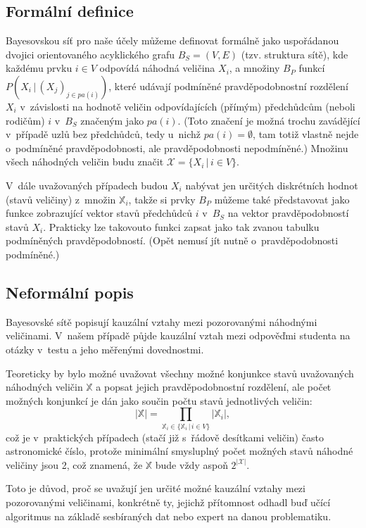 \documentclass[a4paper,twoside,12pt]{scrbook}
\begin{document}
\subsection{Formální definice}
Bayesovskou síť pro naše účely můžeme definovat formálně jako uspořádanou dvojici orientovaného acyklického grafu $B_S = (V,E)$ (tzv. struktura sítě), kde každému prvku $i \in V$ odpovídá náhodná veličina $X_i$, a množiny $B_P$  funkcí $P(X_i\,|\,(X_j)_{j\in pa(i)})$, které udávají podmíněné pravděpodobnostní rozdělení $X_i$ v~závislosti na hodnotě veličin odpovídajících (přímým) předchůdcům (neboli rodičům) $i$ v~$B_S$ značeným jako $pa(i)$. (Toto značení je možná trochu zavádějící v~případě uzlů bez předchůdců, tedy u~nichž $pa(i) = \emptyset$, tam totiž vlastně nejde o~podmíněné pravděpodobnosti, ale pravděpodobnosti nepodmíněné.) Množinu všech náhodných veličin budu značit $\mathcal{X}=\{X_i\,|\,i \in V\}$.

V~dále uvažovaných případech budou $X_i$ nabývat jen určitých diskrétních hodnot (stavů veličiny) z~množin $\mathbb{X}_i$, takže si prvky $B_P$ můžeme také představovat jako funkce zobrazující vektor stavů předchůdců $i$ v~$B_S$ na vektor pravděpodobností stavů $X_i$. Prakticky lze takovouto funkci zapsat jako tak zvanou tabulku podmíněných pravděpodobností. (Opět nemusí jít nutně o~pravděpodobnosti podmíněné.)

\subsection{Neformální popis}
Bayesovské sítě popisují kauzální vztahy mezi pozorovanými náhodnými veličinami. V~našem případě půjde kauzální vztah mezi odpověďmi studenta na otázky v~testu a jeho měřenými dovednostmi.

Teoreticky by bylo možné uvažovat všechny možné konjunkce stavů uvažovaných náhodných veličin $\mathbb{X}$ a popsat jejich pravděpodobnostní rozdělení, ale počet možných konjunkcí je dán jako součin počtu stavů jednotlivých veličin:
\begin{equation}
	\label{eq:conjunctions_cardinality}
	|\mathbb{X}| = \prod_{\mathbb{X}_i \in \{\mathbb{X}_i\,|\,i \in V\}} \left|\mathbb{X}_i\right|,
\end{equation}
což je v~praktických případech (stačí již s~řádově desítkami veličin) často astronomické číslo, protože minimální smysluplný počet možných stavů náhodné veličiny jsou 2, což znamená, že $\mathbb{X}$ bude vždy aspoň $2^{\left|\mathcal{X}\right|}$.

Toto je důvod, proč se uvažují jen určité možné kauzální vztahy mezi pozorovanými veličinami, konkrétně ty, jejichž přítomnost odhadl buď učící algoritmus na základě sesbíraných dat nebo expert na danou problematiku.
\end{document}

